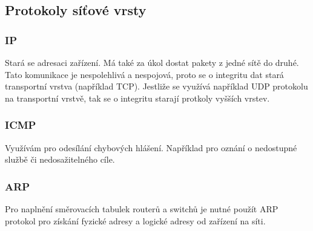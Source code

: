 \subsection{Protokoly síťové vrsty}
\subsubsection{IP}
Stará se adresaci zařízení.
Má také za úkol dostat pakety z jedné sítě do druhé.
Tato komunikace je nespolehlivá a nespojová, proto se o integritu dat stará transportní vrstva (například TCP).
Jestliže se využívá například UDP protokolu na transportní vrstvě, tak se o integritu starají protkoly vyšších vrstev.
\subsubsection{ICMP}
Využívám pro odesílání chybových hlášení.
Například pro oznání o nedostupné službě či nedosažitelného cíle.
\subsubsection{ARP}
Pro naplnění směrovacích tabulek routerů a switchů je nutné použít ARP protokol pro získání fyzické adresy a logické adresy od zařízení na síti.
